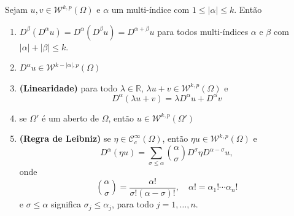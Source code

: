 \documentclass[a4paper, 11pt]{book}
\theoremstyle{definition}
\newcommand{\bR}{\mathbb{R}}
\newcommand{\cC}{\mathcal{C}}
\newcommand{\cW}{\mathcal{W}}
\begin{document}
\begin{tbox} \label{thm:propriedades-derivada-fraca}
    Sejam $u, v \in \cW^{k,p}(\Omega)$ e $\alpha$ um multi-índice com $1 \leqslant |\alpha| \leqslant k$.
    Então 
    \begin{enumerate}[leftmargin=*, label=\textbf{(\alph*)}]
        \item $D^\beta(D^\alpha u) = D^\alpha (D^\beta u) = D^{\alpha + \beta} u$ para todos multi-índices $\alpha$ e $\beta$ com $|\alpha| + |\beta| \leqslant k.$
        \item $D^\alpha u \in \cW^{k - |\alpha|,p}(\Omega)$
        \item \textbf{(Linearidade)} para todo $\lambda \in \bR$, $\lambda u + v \in \cW^{k,p}(\Omega)$ e
        \[
            D^{\alpha}(\lambda u + v) = \lambda D^\alpha u + D^\alpha v
        \]
        \item se $\Omega'$ é um aberto de $\Omega$, então $u \in \cW^{k,p}(\Omega')$
        \item \textbf{(Regra de Leibniz)} se $\eta \in \cC^\infty_c(\Omega)$, então $\eta u \in \cW^{k,p}(\Omega)$ e
        \begin{equation} \label{eq:regra-de-leibniz}
            D^\alpha (\eta u) = \sum_{\sigma \leqslant \alpha} \binom{\alpha}{\sigma} D^{\sigma} \eta D^{\alpha - \sigma} u,
        \end{equation}
        onde
        \[
            \binom{\alpha}{\sigma} = \frac{\alpha!}{\sigma!(\alpha - \sigma)!}, \quad \alpha! = \alpha_1!\cdots \alpha_n!
        \]
        e $\sigma \leqslant \alpha$ significa $\sigma_j \leqslant \alpha_j$, para todo $j = 1,\dots,n$.
    \end{enumerate}
\end{tbox}
\end{document}
